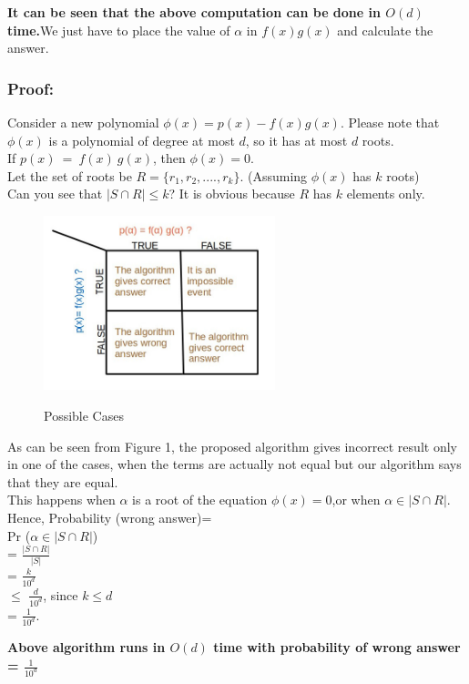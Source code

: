 \documentclass{llncs}
\begin{document}
\textbf{It can be seen that the above computation can be done in $O(d)$ time.}We just have to place the value of $\alpha$ in $f(x)g(x)$ and calculate the answer. 
\subsubsection{Proof:}
Consider a new polynomial $\phi(x) = p(x)- f(x)g(x)$. Please note that $\phi(x)$ is a polynomial of degree at most $d$, so it has at most $d$ roots. \\

If $p(x)\ =\ f(x)\ g(x)$, then $\phi(x)=0$. \\

Let the set of roots be $R= \{r_1, r_2, ...., r_k\}$. (Assuming $\phi(x)$ has $k$ roots)\\

Can you see that $|S \cap R| \leq k$? It is obvious because $R$ has $k$ elements only. \\


\begin{figure}[h!]
\centering
\includegraphics[width=0.6\textwidth]{confusion.jpg}
\label{confusion}
\caption{Possible Cases}
\end{figure}

As can be seen from Figure 1, the proposed algorithm gives incorrect result only in one of the cases, when the terms are actually not equal but our algorithm says that they are equal. \\

This happens when $\alpha$ is a root of the equation $\phi(x)=0$,or when $\alpha \in |S \cap R|$.  Hence, Probability (wrong answer)=\\

Pr ($\alpha \in |S \cap R|$)\\

= $\frac{|S \cap R|}{|S|}$\\

= $\frac{k}{10^d}$\\

$\leq$ $\frac{d}{10^d}$, since $k \leq d$\\

 
= $\frac{1}{10^d}$.

\textbf{Above algorithm runs in $O(d)$ time with probability of wrong answer = $\frac{1}{10^d}$ }



 
\end{document}
